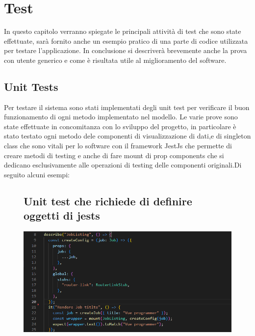 \documentclass[ 4paper,11pt,openany]{book}
\begin{document}
\chapter{Test}
In questo capitolo verranno spiegate le principali attività di test che sono state effettuate, sarà fornito anche un esempio pratico di una parte di codice utilizzata per testare l'applicazione. In conclusione si descriverà brevemente anche la prova con utente generico e come è risultata utile al miglioramento del software.
 
\section{Unit Tests}
Per testare il sistema sono stati implementati degli unit test per verificare il buon funzionamento di ogni metodo implementato nel modello. Le varie prove sono state effettuate in concomitanza con lo sviluppo del progetto, in particolare è stato testato ogni metodo dele componenti di visualizzazione di dati,e di singleton class che sono vitali per lo software con il framework JestJs che permette di creare metodi di testing e anche di fare mount di prop components che si dedicano esclusivamente alle operazioni di testing delle componenti originali.Di seguito alcuni esempi:
\begin{figure}[htpb!] 
	\section{Unit test che richiede di definire oggetti di jests}
	\includegraphics{testWithJestObjects.png}
\end{figure}
\end{document}
